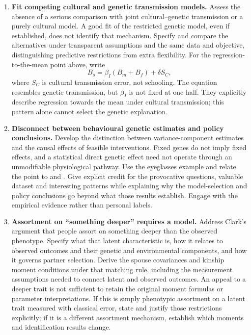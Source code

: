 \documentclass[12pt]{article}
\renewenvironment{itemize}{\begin{enumerate}}{\end{enumerate}}
\begin{document}
\begin{itemize}
$\log\theta_k$ is therefore not a common intercept shift: it can alter
the fitted kinship-decay slope and lineal--collateral contrast used to
recover the structural parameters. Allowing one free $\theta$ does not
generally repair this misspecification; allowing a separate unrestricted
$\theta_k$ for every kinship type would instead remove the cross-kinship
restrictions that make the model informative. A threshold model should
derive these transformations from prevalences and latent correlations.
This population example isolates measurement-scale
misspecification from sampling error; quantify its practical importance
at the prevalences and correlations relevant to Clark's data.
\item \textbf{Fit competing cultural and genetic transmission models.}
Assess the absence of a serious comparison with joint cultural--genetic
transmission or a purely cultural model. A good fit of the restricted
genetic model, even if established, does not identify that mechanism.
Specify and compare the alternatives under transparent assumptions and
the same data and objective, distinguishing predictive restrictions
from extra flexibility. For the regression-to-the-mean point above,
\citet[pp.~8--9, eq.~8]{OttoEtAl1994} write
\[
 B_o=\beta_I(B_m+B_f)+\delta S_C,
\]
where $S_C$ is cultural transmission error, not schooling. The equation
resembles genetic transmission, but $\beta_I$ is not fixed at one half.
They explicitly describe regression towards the mean under cultural
transmission; this pattern alone cannot select the genetic explanation.
\item \textbf{Disconnect between behavioural genetic estimates and policy conclusions.}
Develop the distinction between variance-component estimates and the
causal effects of feasible interventions. Fixed genes do not imply
fixed effects, and a statistical direct genetic effect need not operate
through an unmodifiable physiological pathway. Use the eyeglasses
example and relate the point to \citet{Goldberger1978} and
\citet{Jencks1980}. Give explicit credit for the provocative questions,
valuable dataset and interesting patterns while explaining why the
model-selection and policy conclusions go beyond what those results
establish. Engage with the empirical evidence rather than personal labels.

\item \textbf{Assortment on ``something deeper'' requires a model.}
Address Clark's argument that people assort on something deeper than
the observed phenotype. Specify what that latent characteristic is,
how it relates to observed outcomes and their genetic and environmental
components, and how it governs partner selection. Derive the spouse
covariances and kinship moment conditions under that matching rule,
including the measurement assumptions needed to connect latent and
observed outcomes. An appeal to a deeper trait is not sufficient to
retain the original moment formulas or parameter interpretations.
If this is simply phenotypic assortment on a latent trait measured with
classical error, state and justify those restrictions explicitly; if it
is a different assortment mechanism, establish which moments and
identification results change.


\end{itemize}
\end{document}
